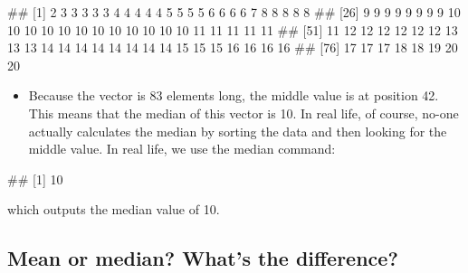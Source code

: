 \documentclass[
]{book}
\newenvironment{Shaded}{\begin{snugshade}}{\end{snugshade}}
\newcommand{\FunctionTok}[1]{\textcolor[rgb]{0.00,0.00,0.00}{#1}}
\newcommand{\NormalTok}[1]{#1}
\newcommand{\SpecialCharTok}[1]{\textcolor[rgb]{0.00,0.00,0.00}{#1}}
\providecommand{\tightlist}{%
  \setlength{\itemsep}{0pt}\setlength{\parskip}{0pt}}
\begin{document}
\begin{Shaded}
\end{Shaded}

\begin{Shaded}
\begin{Highlighting}[]
\NormalTok{\#\#  [1]  2  3  3  3  3  3  4  4  4  4  4  5  5  5  5  6  6  6  6  7  8  8  8  8  8}
\NormalTok{\#\# [26]  9  9  9  9  9  9  9  9 10 10 10 10 10 10 10 10 10 10 10 10 11 11 11 11 11}
\NormalTok{\#\# [51] 11 12 12 12 12 12 12 13 13 13 14 14 14 14 14 14 14 14 15 15 15 16 16 16 16}
\NormalTok{\#\# [76] 17 17 17 18 18 19 20 20}
\end{Highlighting}
\end{Shaded}

\begin{itemize}
\tightlist
\item
  Because the vector is 83 elements long, the middle value is at position 42. This means that the median of this vector is 10. In real life, of course, no-one actually calculates the median by sorting the data and then looking for the middle value. In real life, we use the median command:
\end{itemize}

\begin{Shaded}
\end{Shaded}

\begin{Shaded}
\begin{Highlighting}[]
\NormalTok{\#\# [1] 10}
\end{Highlighting}
\end{Shaded}

which outputs the median value of 10.

\hypertarget{mean-or-median-whats-the-difference}{%
\subsection{Mean or median? What's the difference?}\label{mean-or-median-whats-the-difference}}
\end{document}
